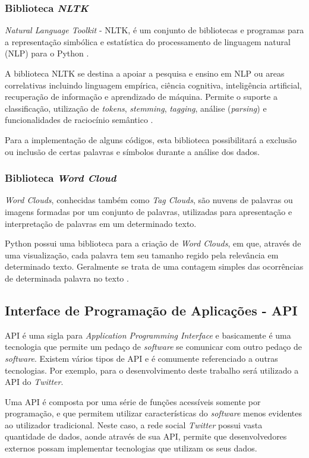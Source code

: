 \subsubsection{Biblioteca \textit{NLTK}}
\textit{Natural Language Toolkit} - NLTK, é um conjunto de bibliotecas e programas para a representação simbólica e estatística do processamento de linguagem natural (NLP) para o Python \cite{nltk}.

A biblioteca NLTK se destina a apoiar a pesquisa e ensino em NLP ou areas correlativas incluindo linguagem empírica, ciência cognitiva, inteligência artificial, recuperação de informação e aprendizado de máquina. Permite o suporte a classificação, utilização de \textit{tokens}, \textit{stemming}, \textit{tagging}, análise (\textit{parsing}) e funcionalidades de raciocínio semântico \cite{nltk}.

Para a implementação de alguns códigos, esta biblioteca possibilitará a exclusão ou inclusão de certas palavras e símbolos durante a análise dos dados.

\subsubsection{Biblioteca \textit{Word Cloud}}

\textit{Word Clouds}, conhecidas também como \textit{Tag Clouds}, são nuvens de palavras ou imagens formadas por um conjunto de palavras, utilizadas para apresentação e interpretação de palavras em um determinado texto.

Python possui uma biblioteca para a criação de \textit{Word Clouds}, em que, através de uma visualização, cada palavra tem seu tamanho regido pela relevância em determinado texto. Geralmente se trata de uma contagem simples das ocorrências de determinada palavra no texto \cite{citeword}.

\subsection{Interface de Programação de Aplicações - API}\label{subsec: api}
API é uma sigla para \textit{Application Programming Interface} e basicamente é uma tecnologia que permite um pedaço de \textit{software} se comunicar com outro pedaço de \textit{software}. Existem vários tipos de API e é comumente referenciado a outras tecnologias. Por exemplo, para o desenvolvimento deste trabalho será utilizado a API do \textit{Twitter}. 

Uma API é composta por uma série de funções acessíveis somente por programação, e que permitem utilizar características do \textit{software} menos evidentes ao utilizador tradicional. Neste caso, a rede social \textit{Twitter} possui vasta quantidade de dados, aonde através de sua API, permite que desenvolvedores externos possam implementar tecnologias que utilizam os seus dados.


